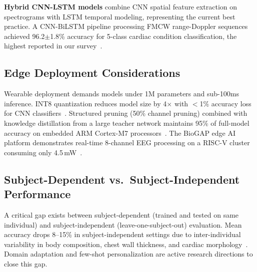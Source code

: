 \documentclass[journal,twoside]{IEEEtran}
\begin{document}
\textbf{Hybrid CNN-LSTM models} combine CNN spatial feature extraction on spectrograms with LSTM temporal modeling, representing the current best practice. A CNN-BiLSTM pipeline processing FMCW range-Doppler sequences achieved 96.2$\pm$1.8\% accuracy for 5-class cardiac condition classification, the highest reported in our survey~\cite{ref_multiscenario_mimo2025}.

\subsection{Edge Deployment Considerations}

Wearable deployment demands models under 1M parameters and sub-100ms inference. INT8 quantization reduces model size by 4$\times$ with $<$1\% accuracy loss for CNN classifiers~\cite{ref_biogap2025}. Structured pruning (50\% channel pruning) combined with knowledge distillation from a large teacher network maintains 95\% of full-model accuracy on embedded ARM Cortex-M7 processors~\cite{ref_ondevice_eegnet2024}. The BioGAP edge AI platform demonstrates real-time 8-channel EEG processing on a RISC-V cluster consuming only 4.5\,mW~\cite{ref_biogap2025}.

\subsection{Subject-Dependent vs.\ Subject-Independent Performance}

A critical gap exists between subject-dependent (trained and tested on same individual) and subject-independent (leave-one-subject-out) evaluation. Mean accuracy drops 8--15\% in subject-independent settings due to inter-individual variability in body composition, chest wall thickness, and cardiac morphology~\cite{ref_radar_complex2025}. Domain adaptation and few-shot personalization are active research directions to close this gap.
\end{document}
